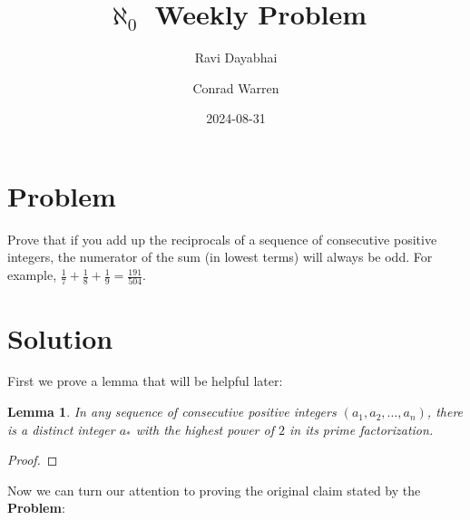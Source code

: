 \documentclass{article}
\title{$\aleph_{0}$ Weekly Problem}
\author{Ravi Dayabhai \and Conrad Warren}
\date{2024-08-31}
\newtheorem*{lemma}{Lemma}
\begin{document}
\maketitle

\section*{Problem}

Prove that if you add up the reciprocals of a sequence of consecutive positive integers, the numerator of the sum (in lowest terms) will always be odd. For example, $\frac{1}{7} + \frac{1}{8} + \frac{1}{9} = \frac{191}{504}$.

\section*{Solution}

First we prove a lemma that will be helpful later:

\begin{lemma}
  In any sequence of consecutive positive integers $(a_{1}, a_{2}, \ldots, a_{n})$, there is a distinct integer $a_{*}$ with the highest power of $2$ in its prime factorization.
\end{lemma}

\begin{proof}
\end{proof}
 
Now we can turn our attention to proving the original claim stated by the \textbf{Problem}:
\end{document}

